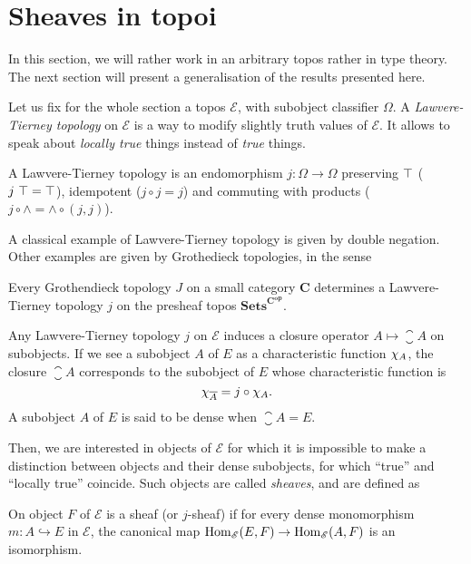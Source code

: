 \section{Sheaves in topoi}
\label{sec:sheaf_topos}

In this section, we will rather work in an arbitrary topos rather in type theory. The next section will present a
generalisation of the results presented here.

Let us fix for the whole section a topos $\mathcal E$, with subobject
classifier $\Omega$. A {\em Lawvere-Tierney topology} on $\mathcal E$
is a way to modify slightly truth values of $\mathcal E$. It allows to
speak about {\em locally true} things instead of {\em true} things.

\begin{defi}\label{defi:LT}
  A Lawvere-Tierney topology is an endomorphism $j:\Omega \to \Omega$
  preserving $\top$ ($j \ \top = \top$), idempotent ($j\circ j =
  j$) and commuting with products ($j \circ \wedge = \wedge \circ (j,j)$).
\end{defi}

A classical example of Lawvere-Tierney topology is given by double
negation. Other examples are given by Grothedieck topologies, in the
sense
\begin{thm}
  Every Grothendieck topology $J$ on a small category $\mathbf C$ determines a
  Lawvere-Tierney topology $j$ on the presheaf topos
  $\mathbf{Sets}^{\mathbf C^{\mathbf{op}}}$.
\end{thm}

Any Lawvere-Tierney topology $j$ on $\mathcal E$ induces a closure operator
$A \mapsto \closure{A}$ on subobjects. If we see a subobject $A$ of $E$
as a characteristic function $\chi_{A}$, the closure $\closure{A}$
corresponds to the subobject of $E$ whose characteristic function is 
%
\[
\chi_{\overline{A}} = j \circ \chi_{A}.
\]%
%
A subobject $A$ of $E$ is said to
be dense when $\closure{A} = E$.

Then, we are interested in objects of $\mathcal E$ for which it is
impossible to make a distinction between objects and their dense
subobjects, \ie{} for which ``true'' and ``locally true''
coincide. Such objects are called {\em sheaves}, and are defined as

\begin{defi}
  On object $F$ of $\mathcal E$ is a sheaf (or $j$-sheaf) if for every
  dense monomorphism $m: A \hookrightarrow E$ in $\mathcal E$, the
  canonical map $\mathrm{Hom}_{\mathcal E}(E,F) \rightarrow \mathrm{Hom}_{\mathcal E}(A,F)$ is an
isomorphism.
\end{defi}

